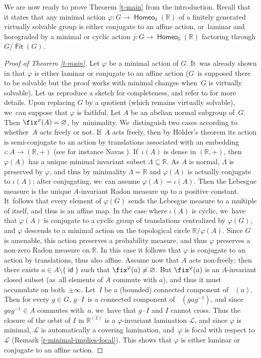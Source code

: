 \documentclass[JEP,XML,SOM,Unicode,NoFloatCountersInSection,published]{cedram}
\theoremstyle{definition}
\DeclareMathOperator{\Fit}{\mathsf{Fit}}
\DeclareMathOperator{\homeo}{\mathsf{Homeo}}
\DeclareMathOperator{\id}{\mathsf{id}}
\DeclareMathOperator{\suppphi}{\mathsf{Supp}^\varphi}
\newcommand{\R}{\mathbb{R}}
\newcommand{\Lcal}{\mathcal{L}}
\begin{document}
We are now ready to prove Theorem \ref{t-main} from the introduction. Recall that it states that any minimal action $\varphi\colon G\to \homeo_0(\R)$ of a finitely generated virtually solvable group is either conjugate to an affine action, or~laminar and horograded by a minimal or cyclic action $j\colon G\to \homeo_0(\R)$ factoring through $G/\Fit(G)$.
\begin{proof}[Proof of Theorem \ref{t-main}]
Let $\varphi$ be a minimal action of $G$. It~was already shown in \cite[Th.\,8.3.8]{BMRT} that $\varphi$ is either laminar or
conjugate to an affine action ($G$~is supposed there to be solvable but the proof works with minimal changes when~$G$ is virtually solvable). Let us reproduce a sketch for completeness, and refer to \cite[Th.\,8.3.8]{BMRT} for more details. Upon replacing $G$ by a quotient (which remains virtually solvable), we~can suppose that $\varphi$ is faithful. Let $A$ be an abelian normal subgroup of~$G$. Then $\fix^{\varphi}(A)=\varnothing$, by~minimality. We~distinguish two cases according to whether~$A$ acts freely or not. If~$A$ acts freely, then by Hölder's theorem its action is semi-conjugate to an action by translations associated with an embedding $\iota \colon A\to (\R, +)$ (see for instance Navas \cite[\S 2.2.4]{Navas-book}). If~$\iota(A)$ is dense in $(\R, +)$, then $\varphi(A)$ has a unique minimal invariant subset $\Lambda \subseteq \R$. As $A$ is normal, $\Lambda$ is preserved by $\varphi$, and thus by minimality $\Lambda=\R$ and $\varphi(A)$ is actually conjugate to $\iota(A)$; after conjugating, we~can assume $\varphi(A)=\iota(A)$. Then the Lebesgue measure is the unique $A$-invariant Radon measure up to a positive constant. It~follows that every element of $\varphi(G)$ sends the Lebesgue measure to a multiple of itself, and thus is an affine map. In the case where $\iota(A)$ is cyclic, we~have that $\varphi(A)$ is conjugate to a cyclic group of translations centralized by $\varphi(G)$, and $\varphi$ descends to a minimal action on the topological circle $\R/\varphi(A)$. Since $G$ is amenable, this action preserves a probability measure, and thus $\varphi$ preserves a non-zero Radon measure on $\R$. In this case it follows that $\varphi$ is conjugate to an action by translations, thus also affine.
Assume now that $A$ acts non-freely; then there exists $a\in A\setminus\{\id\}$ such that $\fix^{\varphi}(a)\neq \varnothing$. But $\fix^{\varphi}(a)$ is an $A$-invariant closed subset (as~all elements of $A$ commute with $a$), and thus it must accumulate on both~$\pm \infty$. Let~$I$ be a (bounded) connected component of $\suppphi(a)$. Then for every $g\in G$, $g\cdot I$~is a connected component of $\suppphi(gag^{-1})$, and since $gag^{-1}\in A$ commutes with~$a$, we~have that $g\cdot I$ and $I$ cannot cross. Thus the closure of the orbit of $I$ in $\R^{(2)}$ is a $\varphi$-invariant lamination $\Lcal$, and since $\varphi$ is minimal, $\Lcal$ is automatically a covering lamination, and~$\varphi$ is focal with respect to $\Lcal$ (Remark \ref{r-minimal-implies-focal}). This shows that $\varphi$ is either laminar or conjugate to an affine action.


\end{proof}
\end{document}
